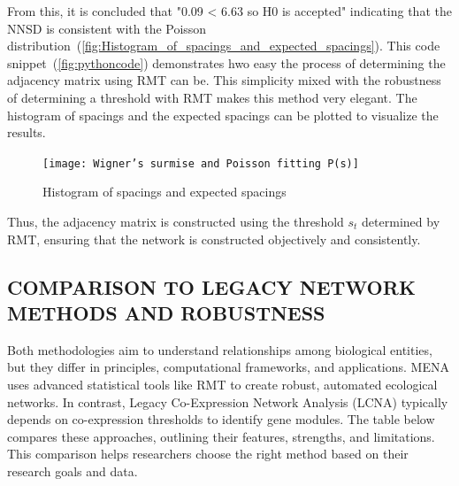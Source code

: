 From this, it is concluded that "0.09 < 6.63 so H0 is accepted" indicating that the NNSD is consistent with the Poisson distribution~(\autoref{fig:Histogram_of_spacings_and_expected_spacings}).
This code snippet~(\autoref{fig:pythoncode}) demonstrates hwo easy the process of determining the adjacency matrix using RMT can be.
This simplicity mixed with the robustness of determining a threshold with RMT makes this method very elegant.
The histogram of spacings and the expected spacings can be plotted to visualize the results.

\begin{figure}[H]
    \centering
    \texttt{[image: Wigner’s surmise and Poisson fitting P(s)]} %
    \caption{Histogram of spacings and expected spacings}
    \label{fig:Histogram_of_spacings_and_expected_spacings}
\end{figure}

\noindent Thus, the adjacency matrix is constructed using the threshold $s_t$ determined by RMT, ensuring that the network is constructed objectively and consistently.

\subsection{COMPARISON TO LEGACY NETWORK METHODS AND ROBUSTNESS}\label{subsec:comparison-to-legacy-network-methods-and-robustness}

Both methodologies aim to understand relationships among biological entities, but they differ in principles, computational frameworks, and applications.
MENA uses advanced statistical tools like RMT to create robust, automated ecological networks.
In contrast, Legacy Co-Expression Network Analysis (LCNA) typically depends on co-expression thresholds to identify gene modules.
The table below compares these approaches, outlining their features, strengths, and limitations.
This comparison helps researchers choose the right method based on their research goals and data.

